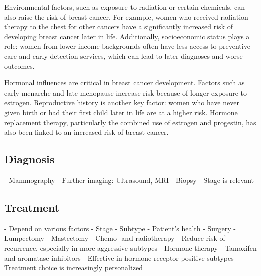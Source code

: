 Environmental factors, such as exposure to radiation or certain chemicals, can
also raise the risk of breast cancer. For example, women who received radiation
therapy to the chest for other cancers have a significantly increased risk of
developing breast cancer later in life\supercite{froes_brandao_prolactin_2016}.
Additionally, socioeconomic status plays a role: women from lower-income
backgrounds often have less access to preventive care and early detection
services, which can lead to later diagnoses and worse
outcomes\supercite{cunningham_mind_2013}.

Hormonal influences are critical in breast cancer development. Factors such as
early menarche and late menopause increase risk because of longer exposure to
estrogen\supercite{nounu_sex_2022}. Reproductive history is another key factor:
women who have never given birth or had their first child later in life are at a
higher risk\supercite{claudia_admoun_etiology_2022}. Hormone replacement
therapy, particularly the combined use of estrogen and progestin, has also been
linked to an increased risk of breast cancer\supercite{turner_meta-analysis_2011}.

\subsection{Diagnosis}

- Mammography
- Further imaging: Ultrasound, MRI
- Biopsy
- Stage is relevant

\subsection{Treatment}

- Depend on various factors
    - Stage
    - Subtype
    - Patient's health
- Surgery
    - Lumpectomy
    - Mastectomy
- Chemo- and radiotherapy
    - Reduce risk of recurrence, especially in more aggressive subtypes
- Hormone therapy
    - Tamoxifen and aromatase inhibitors
    - Effective in hormone receptor-positive subtypes
- Treatment choice is increasingly personalized
